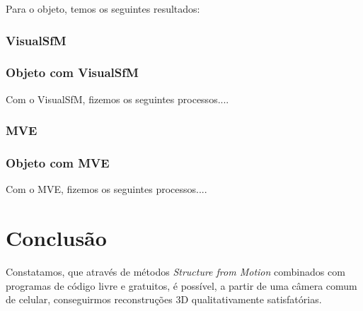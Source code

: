 \documentclass[table, usenames, svgnames, xcolor=dvipsnames]{beamer}
\begin{document}
\begin{frame}
	\begin{center}
	\end{center}
\end{frame}



\begin{frame}
	Para o objeto, temos os seguintes resultados:
\end{frame}

\subsubsection{VisualSfM}

\begin{frame}
\frametitle{\textbf{Objeto com VisualSfM}}
	Com o VisualSfM, fizemos os seguintes processos....
\end{frame}

\subsubsection{MVE}

\begin{frame}
\frametitle{\textbf{Objeto com MVE}}
	Com o MVE, fizemos os seguintes processos....
\end{frame}

\section{Conclusão}

\begin{frame}
	\begin{center}
	Constatamos, que através de métodos \emph{Structure from Motion} combinados com programas de código livre e gratuitos, é possível, a partir de uma câmera comum de celular, conseguirmos  reconstruções 3D qualitativamente satisfatórias.
	\end{center}
\end{frame}
\end{document}
